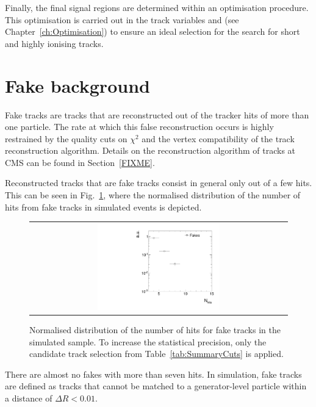 Finally, the final signal regions are determined within an optimisation procedure.
This optimisation is carried out in the track variables \pt and \dedx (see Chapter~\ref{ch:Optimisation}) to ensure an ideal selection for the search for short and  highly ionising tracks.

\section{Fake background}
\label{sec:FakeBkg}
Fake tracks are tracks that are reconstructed out of the tracker hits of more than one particle.
The rate at which this false reconstruction occurs is highly restrained by the quality cuts on $\chi^2$ and the vertex compatibility of the track reconstruction algorithm.
Details on the reconstruction algorithm of tracks at CMS can be found in Section~\ref{FIXME}.

Reconstructed tracks that are fake tracks consist in general only out of a few hits.
This can be seen in Fig.~\ref{fig:NValidFakes}, where the normalised distribution of the number of hits from fake tracks in simulated \WJets events is depicted.
\begin{figure}[!b]
  \centering 
  \begin{tabular}{c}
    \includegraphics[width=0.49\textwidth]{figures/analysis/Background/NValidForFakes_chiTracksfullSelectionNoTriggerCuts.pdf}
  \end{tabular}
  \caption{Normalised distribution of the number of hits for fake tracks in the simulated \WJets sample. To increase the statistical precision, only the candidate track selection from Table~\ref{tab:SummaryCuts} is applied.}
  \label{fig:NValidFakes}
\end{figure}
There are almost no fakes with more than seven hits.
In simulation, fake tracks are defined as tracks that cannot be matched to a generator-level particle within a distance of $\Delta R < 0.01$.

